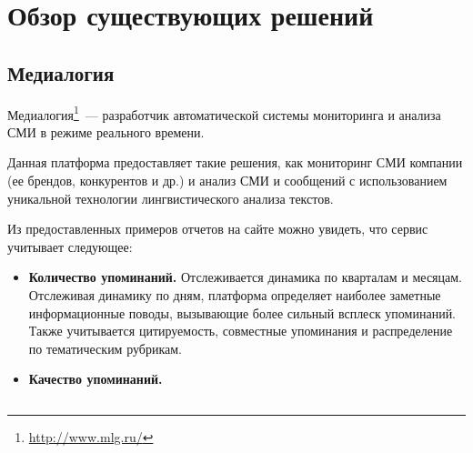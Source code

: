 \section{Обзор существующих решений}

\subsection{Медиалогия}

Медиалогия\footnote{\url{http://www.mlg.ru/}}~--- разработчик автоматической системы мониторинга и анализа СМИ в режиме реального времени.

Данная платформа предоставляет такие решения, как мониторинг СМИ компании (ее брендов, конкурентов и др.) и анализ СМИ и сообщений с использованием уникальной технологии лингвистического анализа текстов.

Из предоставленных примеров отчетов на сайте можно увидеть, что сервис учитывает следующее:

\begin{itemize}

\item \textbf{Количество упоминаний.} Отслеживается динамика по кварталам и месяцам. Отслеживая динамику по дням, платформа определяет наиболее заметные информационные поводы, вызывающие более сильный всплеск упоминаний. Также учитывается цитируемость, совместные упоминания и распределение по тематическим рубрикам.

\item \textbf{Качество упоминаний.}

\end{itemize}

\subsection{}